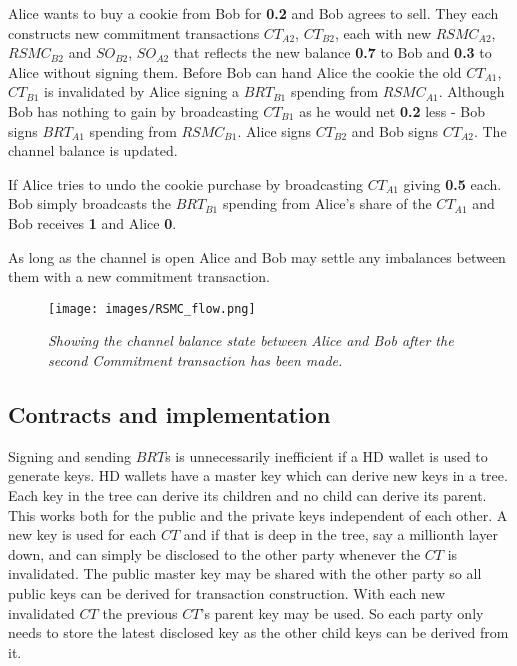 Alice wants to buy a cookie from Bob for \textbf{0.2\bitcoin} and Bob agrees to sell. They each constructs new commitment transactions $CT_{A2}$, $CT_{B2}$, each with new $RSMC_{A2}$, $RSMC_{B2}$ and $SO_{B2}$, $SO_{A2}$ that reflects the new balance \textbf{0.7\bitcoin} to Bob and \textbf{0.3\bitcoin} to Alice without signing them. Before Bob can hand Alice the cookie the old $CT_{A1}$, $CT_{B1}$ is invalidated by Alice signing a $BRT_{B1}$ spending from $RSMC_{A1}$. Although Bob has nothing to gain by broadcasting $CT_{B1}$ as he would net \textbf{0.2\bitcoin} less - Bob signs $BRT_{A1}$ spending from $RSMC_{B1}$. Alice signs $CT_{B2}$ and Bob signs $CT_{A2}$. The channel balance is updated.

If Alice tries to undo the cookie purchase by broadcasting $CT_{A1}$ giving \textbf{0.5\bitcoin} each. Bob simply broadcasts the $BRT_{B1}$ spending from Alice's share of the $CT_{A1}$ and Bob receives \textbf{1\bitcoin} and Alice \textbf{0\bitcoin}. 


As long as the channel is open Alice and Bob may settle any imbalances between them with a new commitment transaction. 

\begin{figure}[!htb]
		\hspace*{-1.2cm} 
	\centering
	\texttt{[image: images/RSMC\_flow.png]}
	\caption{\textit{Showing the channel balance state between Alice and Bob after the second Commitment transaction has been made. 
	}}
	\label{fig:merkle:tree}
		\hspace*{2mm} 
\end{figure}

\subsection{Contracts and implementation}
\label{sec:hdw}
Signing and sending $BRT$s is unnecessarily inefficient if a HD wallet is used to generate keys\cite{bip:0032:hd:wallet}. HD wallets have a master key which can derive new keys in a tree. Each key in the tree can derive its children and no child can derive its parent. This works both for the public and the private keys independent of each other. A new key is used for each $CT$ and if that is deep in the tree, say a millionth layer down, and can simply be disclosed to the other party whenever the $CT$ is invalidated. The public master key may be shared with the other party so all public keys can be derived for transaction construction. With each new invalidated $CT$ the previous $CT$'s parent key may be used. So each party only needs to store the latest disclosed key as the other child keys can be derived from it.

